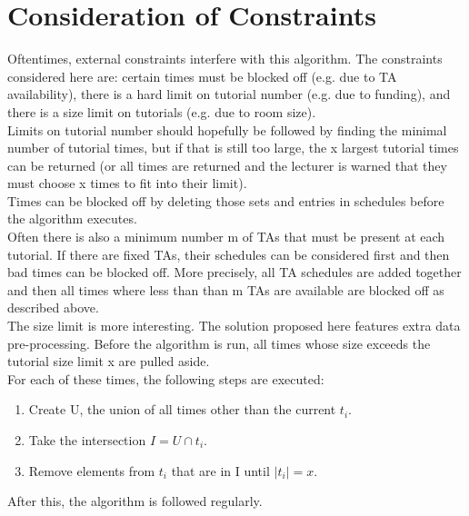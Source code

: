 \documentclass[12pt, a4paper]{article}
\begin{document}
\section{Consideration of Constraints}
Oftentimes, external constraints interfere with this algorithm. The constraints considered here are: certain times must be blocked off (e.g. due to TA availability), there is a hard limit on tutorial number (e.g. due to funding), and there is a size limit on tutorials (e.g. due to room size).\\

Limits on tutorial number should hopefully be followed by finding the minimal number of tutorial times, but if that is still too large, the x largest tutorial times can be returned (or all times are returned and the lecturer is warned that they must choose x times to fit into their limit).\\

Times can be blocked off by deleting those sets and entries in schedules before the algorithm executes.\\

Often there is also a minimum number m of TAs that must be present at each tutorial. If there are fixed TAs, their schedules can be considered first and then bad times can be blocked off. More precisely, all TA schedules are added together and then all times where less than than m TAs are available are blocked off as described above. \\

The size limit is more interesting. The solution proposed here features extra data pre-processing. Before the algorithm is run, all times whose size exceeds the tutorial size limit x are pulled aside. \\
For each of these times, the following steps are executed: \\
\begin{enumerate} 
\item Create U, the union of all times other than the current $t_i$.
\item Take the intersection $I = U \cap t_i$.
\item Remove elements from $t_i$ that are in I until $|t_i|=x$.
\end{enumerate}

After this, the algorithm is followed regularly.
\end{document}
